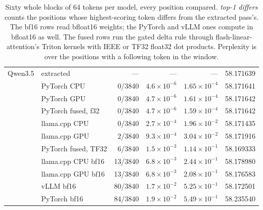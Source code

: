 \documentclass[11pt]{article}
\theoremstyle{plain}
\theoremstyle{definition}
\begin{document}
\begin{table}[t]
\begin{tabular}{llrrrr}
\midrule
Qwen3.5 & extracted            & ---      & ---                & ---                 & 58.171639 \\
        & PyTorch CPU          & 0/3840   & $4.6\times10^{-6}$ & $1.65\times10^{-4}$ & 58.171641 \\
        & PyTorch GPU          & 0/3840   & $4.7\times10^{-6}$ & $1.61\times10^{-4}$ & 58.171642 \\
        & PyTorch fused, f32   & 0/3840   & $4.7\times10^{-6}$ & $1.59\times10^{-4}$ & 58.171642 \\
        & llama.cpp CPU        & 0/3840   & $2.7\times10^{-4}$ & $1.96\times10^{-2}$ & 58.171435 \\
        & llama.cpp GPU        & 2/3840   & $9.3\times10^{-4}$ & $3.04\times10^{-2}$ & 58.171916 \\
        & PyTorch fused, TF32  & 6/3840   & $1.5\times10^{-3}$ & $1.14\times10^{-1}$ & 58.169333 \\
        & llama.cpp CPU bf16   & 13/3840  & $6.8\times10^{-3}$ & $2.44\times10^{-1}$ & 58.178980 \\
        & llama.cpp GPU bf16   & 13/3840  & $6.8\times10^{-3}$ & $2.08\times10^{-1}$ & 58.176583 \\
        & vLLM bf16            & 80/3840  & $1.7\times10^{-2}$ & $5.25\times10^{-1}$ & 58.172501 \\
        & PyTorch bf16         & 84/3840  & $1.9\times10^{-2}$ & $5.49\times10^{-1}$ & 58.235540 \\
\bottomrule
\end{tabular}
\caption{Sixty whole blocks of 64 tokens per model, every position compared.
\emph{top-1 differs} counts the positions whose highest-scoring token differs
from the extracted pass's. The bf16 rows read bfloat16 weights; the PyTorch and
vLLM ones compute in bfloat16 as well. The fused rows run the gated delta rule
through flash-linear-attention's Triton kernels with IEEE or TF32 float32 dot
products. Perplexity is over the
positions with a following token in the window.}
\label{tab:long}
\end{table}
\end{document}

